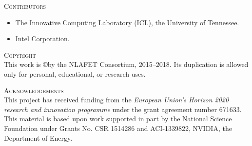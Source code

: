 \documentclass[a4paper,12pt]{article}
\begin{document}
\noindent
\textsc{Contributors}\\[1em]

\begin{itemize}
\item The Innovative Computing Laboratory (ICL), the University of Tennessee.
\item Intel Corporation.
\end{itemize}

\vspace{2em}

\noindent
\textsc{Copyright}\\[1em]
This work is \copyright by the NLAFET Consortium, 2015--2018.
Its duplication is allowed only for personal, educational, or research uses. 

\vspace{2em}


\noindent
\textsc{Acknowledgements}\\[1em] This project has received funding
from the \emph{European Union's Horizon 2020 research and innovation
  programme} under the grant agreement number 671633.  This material
is based upon work supported in part by the National Science
Foundation under Grants No. CSR 1514286 and ACI-1339822, NVIDIA, the
Department of Energy.

%

\newpage

\renewcommand{\contentsname}{Table of Contents}
\tableofcontents

\listoffigures



\newpage

%











\end{document}
